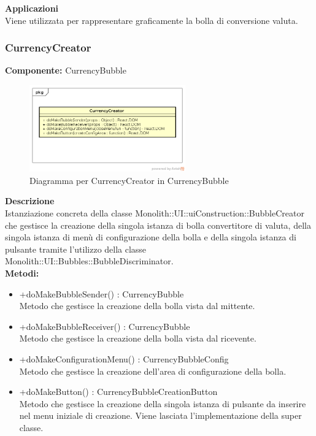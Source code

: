 \textbf{Applicazioni}\\
Viene utilizzata per rappresentare graficamente la bolla di conversione valuta. 


\clearpage

\subsubsection{CurrencyCreator}
\textbf{Componente:}  CurrencyBubble\\
   \FloatBarrier
   \begin{figure}[ht]
   \centering
   \includegraphics[width=0.6\textwidth]{img/single-CurrencyCreator.png}
   \caption{{Diagramma per CurrencyCreator in CurrencyBubble}}
\end{figure}
\FloatBarrier
\textbf{Descrizione}\\
Istanziazione concreta della classe Monolith::UI::uiConstruction::BubbleCreator che gestisce la creazione della singola istanza di bolla convertitore di valuta, della singola istanza di menù di configurazione della bolla e della singola istanza di pulsante tramite l'utilizzo della classe Monolith::UI::Bubbles::BubbleDiscriminator.
\\
\textbf{Metodi:} 
\begin{itemize}
\item +doMakeBubbleSender() : CurrencyBubble 
\\
Metodo che gestisce la creazione della bolla vista dal mittente.
\item +doMakeBubbleReceiver() : CurrencyBubble 
\\
Metodo che gestisce la creazione della bolla vista dal ricevente.
\item +doMakeConfigurationMenu() : CurrencyBubbleConfig 
\\
Metodo che gestisce la creazione dell'area di configurazione della bolla.
\item +doMakeButton() : CurrencyBubbleCreationButton 
\\
Metodo che gestisce la creazione della singola istanza di pulsante da inserire nel menu iniziale di creazione. Viene lasciata l'implementazione della super classe.
\end{itemize} 


